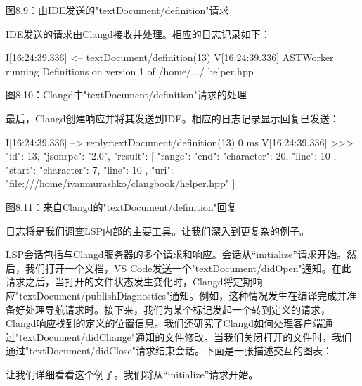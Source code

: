\begin{center}
图8.9：由IDE发送的"textDocument/definition"请求
\end{center}

IDE发送的请求由Clangd接收并处理。相应的日志记录如下：

\begin{shell}
I[16:24:39.336] <-- textDocument/definition(13)
V[16:24:39.336] ASTWorker running Definitions on version 1 of /home/.../
helper.hpp
\end{shell}


\begin{center}
图8.10：Clangd中"textDocument/definition"请求的处理
\end{center}

最后，Clangd创建响应并将其发送到IDE。相应的日志记录显示回复已发送：

\begin{shell}
I[16:24:39.336] --> reply:textDocument/definition(13) 0 ms
V[16:24:39.336] >>> {
    "id": 13,
    "jsonrpc": "2.0",
    "result": [
    {
        "range": {
            "end": {
                "character": 20,
                "line": 10
            },
            "start": {
                "character": 7,
                "line": 10
            }
        },
        "uri": "file:///home/ivanmurashko/clangbook/helper.hpp"
    }
    ]
}
\end{shell}


\begin{center}
图8.11：来自Clangd的"textDocument/definition"回复
\end{center}

日志将是我们调查LSP内部的主要工具。让我们深入到更复杂的例子。


LSP会话包括与Clangd服务器的多个请求和响应。会话从“initialize”请求开始。然后，我们打开一个文档，VS Code发送一个"textDocument/didOpen"通知。在此请求之后，当打开的文件状态发生变化时，Clangd将定期响应"textDocument/publishDiagnostics"通知。例如，这种情况发生在编译完成并准备好处理导航请求时。接下来，我们为某个标记发起一个转到定义的请求，Clangd响应找到的定义的位置信息。我们还研究了Clangd如何处理客户端通过"textDocument/didChange"通知的文件修改。当我们关闭打开的文件时，我们通过"textDocument/didClose"请求结束会话。下面是一张描述交互的图表：


让我们详细看看这个例子。我们将从“initialize”请求开始。

